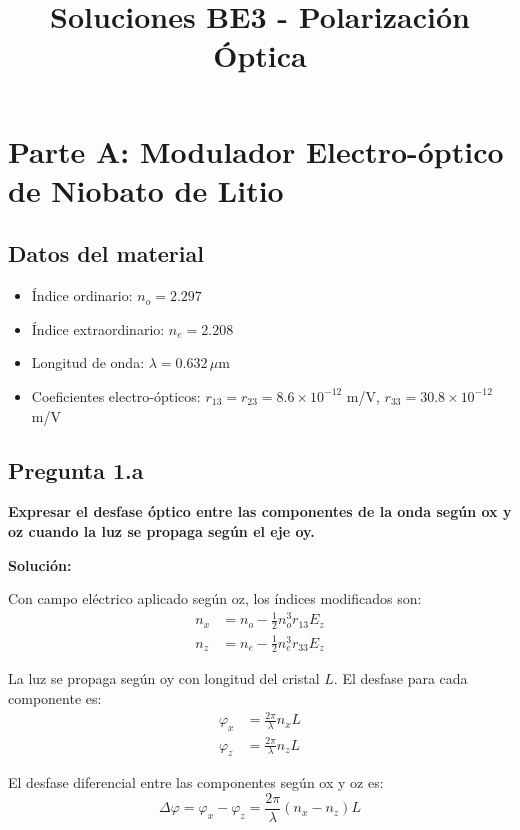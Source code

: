 \documentclass[12pt,a4paper]{article}
\title{Soluciones BE3 - Polarización Óptica}
\author{}
\date{}
\begin{document}
\maketitle

\section*{Parte A: Modulador Electro-óptico de Niobato de Litio}

\subsection*{Datos del material}
\begin{itemize}
    \item Índice ordinario: $n_o = 2.297$
    \item Índice extraordinario: $n_e = 2.208$
    \item Longitud de onda: $\lambda = 0.632 \, \mu\text{m}$
    \item Coeficientes electro-ópticos: $r_{13} = r_{23} = 8.6 \times 10^{-12}$ m/V, $r_{33} = 30.8 \times 10^{-12}$ m/V
\end{itemize}

\subsection*{Pregunta 1.a}
\textbf{Expresar el desfase óptico entre las componentes de la onda según ox y oz cuando la luz se propaga según el eje oy.}

\vspace{0.3cm}
\textbf{Solución:}

Con campo eléctrico aplicado según oz, los índices modificados son:
\begin{align}
n_x &= n_o - \frac{1}{2}n_o^3 r_{13} E_z \\
n_z &= n_e - \frac{1}{2}n_e^3 r_{33} E_z
\end{align}

La luz se propaga según oy con longitud del cristal $L$. El desfase para cada componente es:
\begin{align}
\varphi_x &= \frac{2\pi}{\lambda} n_x L \\
\varphi_z &= \frac{2\pi}{\lambda} n_z L
\end{align}

El desfase diferencial entre las componentes según ox y oz es:
\begin{equation}
\Delta\varphi = \varphi_x - \varphi_z = \frac{2\pi}{\lambda} (n_x - n_z) L
\end{equation}
\end{document}
